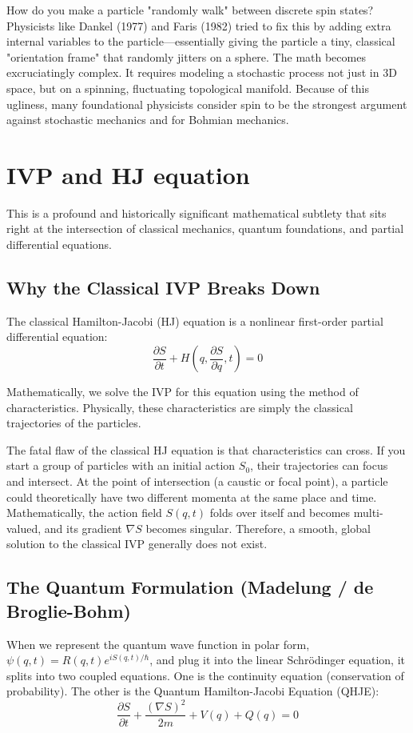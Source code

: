 \documentclass[11pt]{article}
\begin{document}
How do you make a particle "randomly walk" between discrete spin states?
Physicists like Dankel (1977) and Faris (1982) tried to fix this by adding
extra internal variables to the particle—essentially giving the particle a
tiny, classical "orientation frame" that randomly jitters on a sphere. 
The math becomes excruciatingly complex. It requires modeling a stochastic
process not just in 3D space, but on a spinning, fluctuating topological
manifold. Because of this ugliness, many foundational physicists consider
spin to be the strongest argument against stochastic mechanics and  for
Bohmian mechanics.

\section{IVP and HJ equation}
This is a profound and historically significant mathematical subtlety that
sits right at the intersection of classical mechanics, quantum foundations,
and partial differential equations. 

\subsection{ Why the Classical IVP Breaks Down}
The classical Hamilton-Jacobi (HJ) equation is a nonlinear first-order
partial differential equation:
$$\frac{\partial S}{\partial t} + H\left(q, \frac{\partial S}{\partial q}, t\right) = 0$$

Mathematically, we solve the IVP for this equation using the method of 
characteristics. Physically, these characteristics are simply the classical
trajectories of the particles. 

The fatal flaw of the classical HJ equation is that characteristics can
cross. If you start a group of particles with an initial action $S_0$, 
their trajectories can focus and intersect. At the point of intersection
(a caustic or focal point), a particle could theoretically have two
different momenta at the same place and time. Mathematically, the action
field $S(q,t)$ folds over itself and becomes multi-valued, and its gradient
$\nabla S$ becomes singular. Therefore, a smooth, global solution to the
classical IVP generally does not exist.

\subsection{The Quantum Formulation (Madelung / de Broglie-Bohm)}
When we represent the quantum wave function in polar form, 
$\psi(q,t) = R(q,t) e^{iS(q,t)/\hbar}$, and plug it into the linear
Schrödinger equation, it splits into two coupled equations. One is the
continuity equation (conservation of probability). The other is the 
Quantum Hamilton-Jacobi Equation (QHJE):
$$\frac{\partial S}{\partial t} + \frac{(\nabla S)^2}{2m} 
+ V(q) + Q(q) = 0$$
\end{document}
